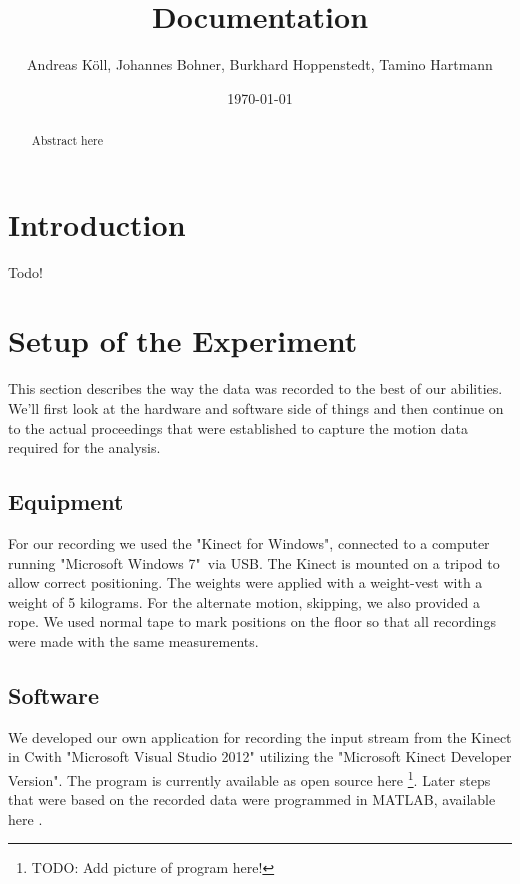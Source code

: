 \documentclass[a4paper]{article}
\newcommand{\CS}{C\nolinebreak\hspace{-.05em}\raisebox{.6ex}{\scriptsize\bf \#\ }}
\begin{document}
\title{Documentation}
\author{Andreas Köll, Johannes Bohner, Burkhard Hoppenstedt, Tamino Hartmann}
\date{\today}

\maketitle

\begin{abstract}

Abstract here
\end{abstract}
\newpage

\section{Introduction}

Todo!

\section{Setup of the Experiment}

This section describes the way the data was recorded to the best of our abilities.
We'll first look at the hardware and software side of things and then continue on to the actual proceedings that were established to capture the motion data required for the analysis.

\subsection{Equipment}

For our recording we used the "Kinect for Windows"\texttrademark \cite{kinect}, connected to a computer running "Microsoft Windows 7"\textregistered \ via USB.
The Kinect is mounted on a tripod to allow correct positioning.
The weights were applied with a weight-vest with a weight of 5 kilograms.
For the alternate motion, skipping, we also provided a rope.
We used normal tape to mark positions on the floor so that all recordings were made with the same measurements.

\subsection{Software}

We developed our own application for recording the input stream from the Kinect in \CS with "Microsoft Visual Studio 2012" utilizing the "Microsoft Kinect Developer Version".
The program is currently available as open source here \cite{csprogram}\footnote{TODO: Add picture of program here!}.
Later steps that were based on the recorded data were programmed in MATLAB, available here \cite{matlabprograms}.
\end{document}
